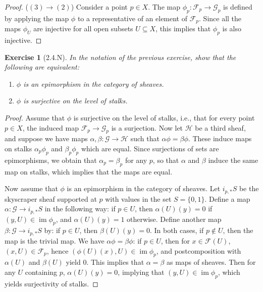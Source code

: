 \documentclass{amsart}
\newtheorem*{exercise*}{Exercise}
\begin{document}
\begin{proof}
    \vspace{0.1in}

    ($(3)\rightarrow (2)$) Consider a point $p\in X$. The map $\phi_p:\mathcal{F}_p\rightarrow \mathcal{G}_p$ is defined by applying the map $\phi$ to a representative of an element of $\mathcal{F}_p$. Since all the maps $\phi_U$ are injective for all open subsets $U\subseteq X$, this implies that $\phi_p$ is also injective. 
\end{proof}

\vspace{0.1in}


\begin{exercise*}[2.4.N]
    In the notation of the previous exercise, show that the following are equivalent:
    \begin{enumerate}
        \item $\phi$ is an epimorphism in the category of sheaves.
        \item $\phi$ is surjective on the level of stalks.
    \end{enumerate}
\end{exercise*}

\begin{proof}
    Assume that $\phi$ is surjective on the level of stalks, i.e., that for every point $p \in X$, the induced map $\mathcal{F}_p \to \mathcal{G}_p$ is a surjection. Now let $\mathcal{H}$
    be a third sheaf, and suppose we have maps $\alpha, \beta : \mathcal{G} \to \mathcal{H}$ such that $\alpha \phi = \beta \phi$. These induce maps on stalks $\alpha_p\phi_p$ and
    $\beta_p\phi_p$ which are equal. Since surjections of sets are epimorphisms, we obtain that $\alpha_p = \beta_p$ for any $p$, so that $\alpha$ and $\beta$ induce the same
    map on stalks, which implies that the maps are equal.

    Now assume that $\phi$ is an epimorphism in the category of sheaves. Let $i_{p,*}S$ be the skyscraper sheaf supported at $p$ with values in the set $S = \{0,1\}$.
    Define a map $\alpha: \mathcal{G} \to i_{p,*}S$ in the following way: if $p \in U$, then $\alpha(U)(y) = 0$ if $(y, U) \in \operatorname{im}\phi_p$, and $\alpha(U)(y) = 1$ otherwise.
    Define another map $\beta: \mathcal{G} \to i_{p, *}S$ by: if $p \in U$, then $\beta(U)(y) = 0$. In both cases, if $p \not\in U$, then the map is the trivial map.
    We have $\alpha\phi = \beta\phi$: if $p \in U$, then for $x \in \mathcal{F}(U)$, $(x, U) \in \mathcal{F}_p$, hence $(\phi(U)(x), U) \in \operatorname{im}\phi_p$, and postcomposition with $\alpha(U)$ and $\beta(U)$ yield
    $0$. This implies that $\alpha = \beta$ as maps of sheaves. Then for any $U$ containing $p$, $\alpha(U)(y) = 0$, implying that $(y, U) \in \operatorname{im}\phi_p$, which yields
    surjectivity of stalks.
\end{proof}
\end{document}
